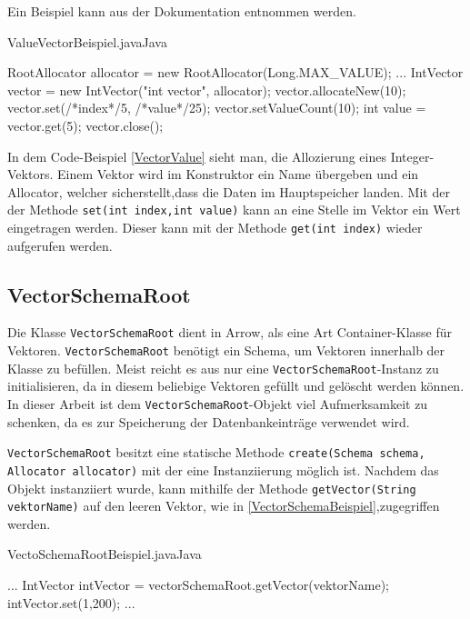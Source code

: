 Ein Beispiel kann aus der Dokumentation \cite{Apache:Arrow:ValueVector} entnommen werden.

\begin{codeblock}{ValueVectorBeispiel.java}{Java}
  \begin{javacode}
  \label{VectorValue}
RootAllocator allocator = new RootAllocator(Long.MAX_VALUE);
...
IntVector vector = new IntVector("int vector", allocator);
vector.allocateNew(10);
vector.set(/*index*/5, /*value*/25);
vector.setValueCount(10);
int value = vector.get(5); 
vector.close();
  \end{javacode}
\end{codeblock}

In dem Code-Beispiel \ref{VectorValue} sieht man, die Allozierung eines Integer-Vektors. Einem Vektor wird im Konstruktor ein Name übergeben und ein Allocator, welcher sicherstellt,dass die Daten im Hauptspeicher landen.
Mit der der Methode \texttt{set(int index,int value)} kann an eine Stelle im Vektor ein Wert eingetragen werden.
Dieser kann mit der Methode \texttt{get(int index)} wieder aufgerufen werden.


\subsection{VectorSchemaRoot}

Die Klasse \texttt{VectorSchemaRoot} dient in Arrow, als eine Art Container-Klasse für Vektoren. \texttt{VectorSchemaRoot} benötigt ein Schema, um Vektoren innerhalb der Klasse zu befüllen.
Meist reicht es aus nur eine \texttt{VectorSchemaRoot}-Instanz zu initialisieren, da in diesem beliebige Vektoren gefüllt und gelöscht werden können.
In dieser Arbeit ist dem \texttt{VectorSchemaRoot}-Objekt viel Aufmerksamkeit zu schenken, da es zur Speicherung der Datenbankeinträge verwendet wird.

\texttt{VectorSchemaRoot} besitzt eine statische Methode \texttt{create(Schema schema, Allocator allocator)} mit der eine Instanziierung möglich ist.
Nachdem das Objekt instanziiert wurde, kann mithilfe der Methode \texttt{getVector(String vektorName)} auf den leeren Vektor, wie in \ref{VectorSchemaBeispiel},zugegriffen werden.

\begin{codeblock}{VectoSchemaRootBeispiel.java}{Java}
  \begin{javacode}
  \label{VectorSchemaBeispiel}
...
IntVector intVector = vectorSchemaRoot.getVector(vektorName);
intVector.set(1,200);
...
  \end{javacode}
\end{codeblock}


